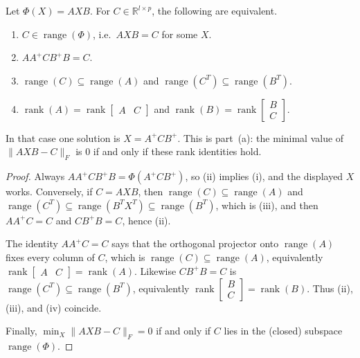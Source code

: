 \documentclass[11pt,a4paper]{article}
\DeclareMathOperator{\rank}{rank}
\begin{document}
\begin{lemma}
\label{lem:phi-range}
Let \(\Phi(X)=AXB\). For \(C\in\mathbb{R}^{l\times p}\), the following are equivalent.
\begin{enumerate}[label=\textup{(\roman*)}]
    \item \(C\in\operatorname{range}(\Phi)\), i.e.\ \(AXB=C\) for some \(X\).
    \item \(AA^{+}CB^{+}B=C\).
    \item \(\operatorname{range}(C)\subseteq\operatorname{range}(A)\) and \(\operatorname{range}(C^{T})\subseteq\operatorname{range}(B^{T})\).
    \item \(\rank(A)=\rank\begin{bmatrix} A & C \end{bmatrix}\) and \(\rank(B)=\rank\begin{bmatrix} B \\ C \end{bmatrix}\).
\end{enumerate}
In that case one solution is \(X=A^{+}CB^{+}\). This is part~(a): the minimal value of \(\|AXB-C\|_{F}\) is \(0\) if and only if these rank identities hold.
\end{lemma}

\begin{proof}
Always \(AA^{+}CB^{+}B=\Phi(A^{+}CB^{+})\), so (ii) implies (i), and the displayed \(X\) works. Conversely, if \(C=AXB\), then \(\operatorname{range}(C)\subseteq\operatorname{range}(A)\) and \(\operatorname{range}(C^{T})\subseteq\operatorname{range}(B^{T}X^{T})\subseteq\operatorname{range}(B^{T})\), which is (iii), and then \(AA^{+}C=C\) and \(CB^{+}B=C\), hence (ii).

The identity \(AA^{+}C=C\) says that the orthogonal projector onto \(\operatorname{range}(A)\) fixes every column of \(C\), which is \(\operatorname{range}(C)\subseteq\operatorname{range}(A)\), equivalently \(\rank\begin{bmatrix} A & C \end{bmatrix}=\rank(A)\). Likewise \(CB^{+}B=C\) is \(\operatorname{range}(C^{T})\subseteq\operatorname{range}(B^{T})\), equivalently \(\rank\begin{bmatrix} B \\ C \end{bmatrix}=\rank(B)\). Thus (ii), (iii), and (iv) coincide.

Finally, \(\min_{X}\|AXB-C\|_{F}=0\) if and only if \(C\) lies in the (closed) subspace \(\operatorname{range}(\Phi)\).
\end{proof}
\end{document}
